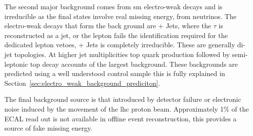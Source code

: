 The second major background comes from \ac{sm} electro-weak decays and 
is irreducible as the final states involve real missing energy, from 
neutrinos. The electro-weak decays that form the back ground are 
\HepProcess{\PW\to\Ptau\Pnu} + Jets, where the $\tau$ is reconstructed as a 
jet, or the lepton fails the identification required for the dedicated lepton 
vetoes, \HepProcess{\PZ\to\Pnu\APnu} + Jets is completely irreducible. These 
are generally di-jet topologies. At higher jet multiplicities top quark 
production followed by semi-leptonic top decay accounts of the largest 
background. These backgrounds are predicted using a well understood control 
sample this is fully explained in 
Section~\ref{sec:electro_weak_background_prediciton}.

The final background source is that introduced by detector failure or 
electronic noise induced by the movement of the \ac{lhc} proton beam.
Approximately 1$\%$ of the ECAL read out is not available in offline event 
reconstruction, this provides a source of fake missing energy.

